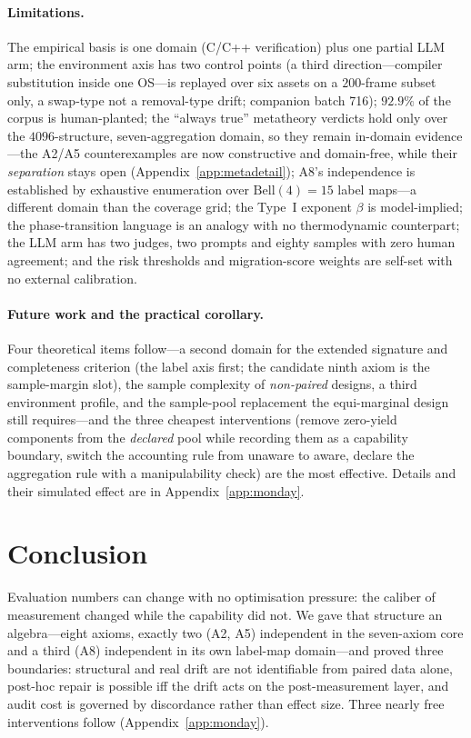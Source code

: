 \documentclass{article}
\begin{document}
\paragraph{Limitations.} The empirical basis is one domain (C/C++ verification) plus one partial LLM arm;
the environment axis has two control points (a third direction---compiler substitution inside one
OS---is replayed over six assets on a $200$-frame subset only, a swap-type not a removal-type drift;
companion batch 716); $92.9\%$ of the corpus is
human-planted; the ``always true'' metatheory verdicts hold only over the $4096$-structure,
seven-aggregation domain, so they remain in-domain evidence---the A2/A5 counterexamples are now
constructive and domain-free, while their \emph{separation} stays open
(Appendix~\ref{app:metadetail}); A8's independence is established by exhaustive enumeration over
$\mathrm{Bell}(4)=15$ label maps---a different domain than the coverage grid; the Type~I
exponent $\beta$ is model-implied; the phase-transition language is an analogy with no thermodynamic
counterpart; the LLM arm has two judges, two prompts and eighty samples with zero human agreement; and the
risk thresholds and migration-score weights are self-set with no external calibration.

\paragraph{Future work and the practical corollary.} Four theoretical items follow---a second domain for
the extended signature and completeness criterion (the label axis first; the candidate ninth axiom is the
sample-margin slot), the sample complexity of \emph{non-paired} designs, a third environment profile, and
the sample-pool replacement the equi-marginal design still requires---and the three cheapest interventions
(remove zero-yield components from the \emph{declared} pool while recording them as a capability boundary,
switch the accounting rule from unaware to aware, declare the aggregation rule with a manipulability check)
are the most effective. Details and their simulated effect are in Appendix~\ref{app:monday}.

\section{Conclusion}
\label{sec:conclusion}

Evaluation numbers can change with no optimisation pressure: the caliber of measurement changed while the
capability did not. We gave that structure an algebra---eight axioms, exactly two (A2, A5) independent in
the seven-axiom core and a third (A8) independent in its own label-map domain---and proved three
boundaries: structural and real drift are not identifiable from paired data alone, post-hoc repair is
possible iff the drift acts on the post-measurement layer, and audit cost is governed by discordance rather
than effect size. Three nearly free interventions follow (Appendix~\ref{app:monday}).
\end{document}

